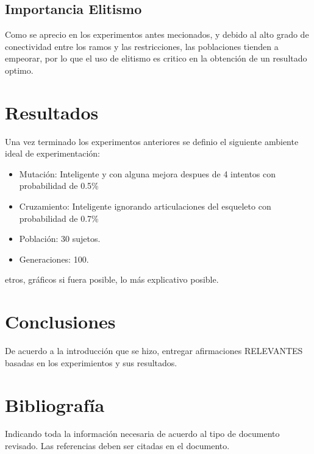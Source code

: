 \documentclass[letter, 10pt]{article}
\begin{document}
\subsection{Importancia Elitismo}
Como se aprecio en los experimentos antes mecionados, y debido al alto grado de
conectividad entre los ramos y las restricciones, las poblaciones tienden a
empeorar, por lo que el uso de elitismo es critico en la obtención de un resultado optimo.

\begin{center}

\end{center}




\begin{center}

\end{center}

\begin{center}

\end{center}

\section{Resultados}
Una vez terminado los experimentos anteriores se definio el siguiente ambiente ideal de experimentación:
\begin{itemize}
 \item Mutación: Inteligente y con alguna mejora despues de 4 intentos con probabilidad de 0.5\%
 \item Cruzamiento: Inteligente ignorando articulaciones del esqueleto con probabilidad de 0.7\%
 \item Población: 30 sujetos.
 \item Generaciones: 100.
\end{itemize}

\begin{center}

\end{center}

\begin{center}

\end{center}
\begin{center}

\end{center}



etros, gr\'aficos si fuera
posible, lo m\'as explicativo posible.

\section{Conclusiones}
De acuerdo a la introducci\'on que se hizo, entregar afirmaciones RELEVANTES basadas en los experimientos
y sus resultados.

\section{Bibliograf\'ia}
Indicando toda la informaci\'on necesaria de acuerdo al tipo de documento revisado. Las referencias deben ser citadas en el documento.


\end{document}
